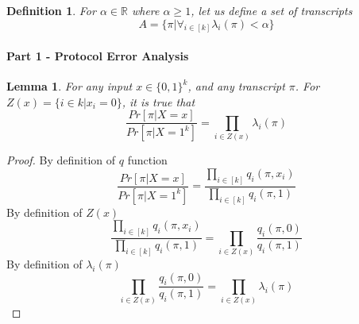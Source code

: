 \documentclass{article}
\theoremstyle{plain}
\newtheorem{lemma}[theorem]{Lemma}
\newtheorem{definition}{Definition}
\begin{document}
\begin{definition}
For $\alpha \in \mathbb{R}$ where $\alpha \geq 1$, let us define a set of transcripts 
\begin{equation*}
    A = \{\pi | \forall_{i \in [k]} \lambda_i (\pi) < \alpha \}
\end{equation*}
\end{definition}


\paragraph{Part 1 - Protocol Error Analysis}
\begin{lemma}
For any input $x \in \{0,1\}^k$, and any transcript $\pi$. For $Z(x) = \{i \in k | x_i = 0\}$, it is true that  \newline
\begin{equation*}
    \frac{Pr[\pi | X = x]}{Pr[\pi | X = 1^k]} = \prod_{i \in Z(x)} \lambda_i(\pi)
\end{equation*}
\end{lemma}
\begin{proof}
By definition of $q$ function
\begin{equation*}
    \frac{Pr[\pi | X = x]}{Pr[\pi | X = 1^k]} = \frac{\prod_{i \in [k]} q_i (\pi, x_i)}{\prod_{i \in [k]} q_i (\pi, 1)}
\end{equation*}
By definition of $Z(x)$
\begin{equation*}
    \frac{\prod_{i \in [k]} q_i (\pi, x_i)}{\prod_{i \in [k]} q_i (\pi, 1)} = \prod_{i \in Z(x)} \frac{q_i (\pi, 0)}{q_i (\pi, 1)}
\end{equation*}
By definition of $\lambda_i (\pi)$
\begin{equation*}
    \prod_{i \in Z(x)} \frac{q_i (\pi, 0)}{q_i (\pi, 1)} = \prod_{i \in Z(x)} \lambda_i (\pi)
\end{equation*}
\end{proof}
\end{document}
